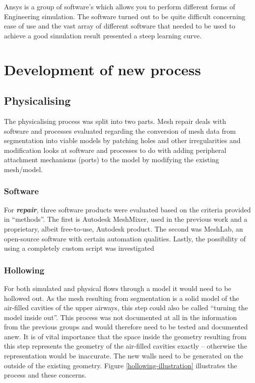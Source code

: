 \documentclass[MME,Projekt,english]{twbook}%
\begin{document}
Ansys is a group of software’s which allows you to perform different forms of Engineering simulation. The software turned out to be quite difficult concerning ease of use and the vast array of different software that needed to be used to achieve a good simulation result presented a steep learning curve. 

\newpage
\section{Development of new process}

\subsection{Physicalising}

The physicalising process was split into two parts. Mesh repair deals with software and processes evaluated regarding the conversion of mesh data from segmentation into viable models by patching holes and other irregularities and modification looks at software and processes to do with adding peripheral attachment mechanisms (ports) to the model by modifying the existing mesh/model.

\subsubsection{Software}

For \textbf{\emph{repair}}, three software products were evaluated based on the criteria provided in “methods”. The first is Autodesk MeshMixer, used in the previous work and a proprietary, albeit free-to-use, Autodesk product. The second was MeshLab, an open-source software with certain automation qualities. Lastly, the possibility of using a completely custom script was investigated

\subsubsection{Hollowing}

For both simulated and physical flows through a model it would need to be hollowed out. As the mesh resulting from segmentation is a solid model of the air-filled cavities of the upper airways, this step could also be called “turning the model inside out”. This process was not documented at all in the information from the previous groups and would therefore need to be tested and documented anew. It is of vital importance that the space inside the geometry resulting from this step represents the geometry of the air-filled cavities exactly – otherwise the representation would be inaccurate. The new walls need to be generated on the outside of the existing geometry. Figure \ref{hollowing-illustration} illustrates the process and these concerns.
\end{document}
